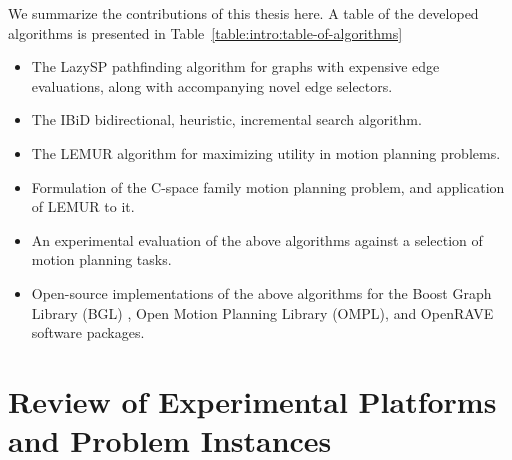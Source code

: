 We summarize the contributions of this thesis here.
A table of the developed algorithms is presented in
Table~\ref{table:intro:table-of-algorithms}

\begin{itemize}
\item The LazySP pathfinding algorithm for graphs with expensive
   edge evaluations,
   along with accompanying novel edge selectors.
\item The IBiD bidirectional, heuristic, incremental search algorithm.
\item The LEMUR algorithm for maximizing utility
   in motion planning problems.
\item Formulation of the C-space family motion planning problem,
   and application of LEMUR to it.
\item An experimental evaluation of the above algorithms against a
   selection of motion planning tasks.
\item Open-source implementations of the above algorithms for the
   Boost Graph Library (BGL) \citep{siek2001boostgraph},
   Open Motion Planning Library (OMPL), \citep{sucan2012ompl}
   and OpenRAVE \citep{diankov2010openrave} software packages.
\end{itemize}



\section{Review of Experimental Platforms and Problem Instances}

